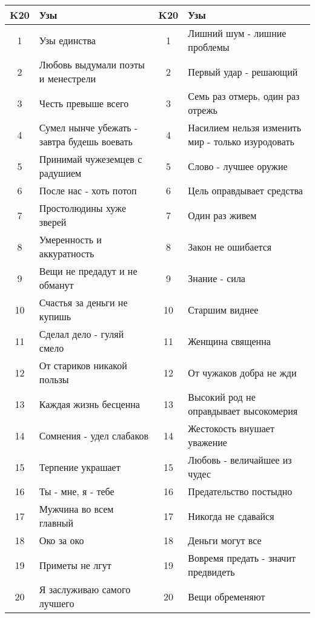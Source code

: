\begin{center}
\begin{tabular}{ |c|p{7cm}|c|p{7cm}| }
\hline
K20 & \textbf{Узы} & K20 & \textbf{Узы} \\ \hline
1 & Узы единства & 1 & Лишний шум - лишние проблемы \\ \hline
2 & Любовь выдумали поэты и менестрели & 2 & Первый удар - решающий \\ \hline
3 & Честь превыше всего & 3 & Семь раз отмерь, один раз отрежь \\ \hline
4 & Сумел нынче убежать - завтра будешь воевать & 4 & Насилием нельзя изменить мир - только изуродовать \\ \hline
5 & Принимай чужеземцев с радушием & 5 & Слово - лучшее оружие \\ \hline
6 & После нас - хоть потоп & 6 & Цель оправдывает средства \\ \hline
7 & Простолюдины хуже зверей & 7 & Один раз живем \\ \hline
8 & Умеренность и аккуратность & 8 & Закон не ошибается \\ \hline
9 & Вещи не предадут и не обманут & 9 & Знание - сила \\ \hline
10 & Счастья за деньги не купишь & 10 & Старшим виднее \\ \hline
11 & Сделал дело - гуляй смело & 11 & Женщина священна \\ \hline
12 & От стариков никакой пользы & 12 & От чужаков добра не жди \\ \hline
13 & Каждая жизнь бесценна & 13 & Высокий род не оправдывает высокомерия \\ \hline
14 & Сомнения - удел слабаков & 14 & Жестокость внушает уважение \\ \hline
15 & Терпение украшает & 15 & Любовь - величайшее из чудес \\ \hline
16 & Ты - мне, я - тебе & 16 & Предательство постыдно \\ \hline
17 & Мужчина во всем главный & 17 & Никогда не сдавайся \\ \hline
18 & Око за око & 18 & Деньги могут все \\ \hline
19 & Приметы не лгут & 19 & Вовремя предать - значит предвидеть \\ \hline
20 & Я заслуживаю самого лучшего & 20 & Вещи обременяют \\ \hline
\end{tabular}
\end{center}
